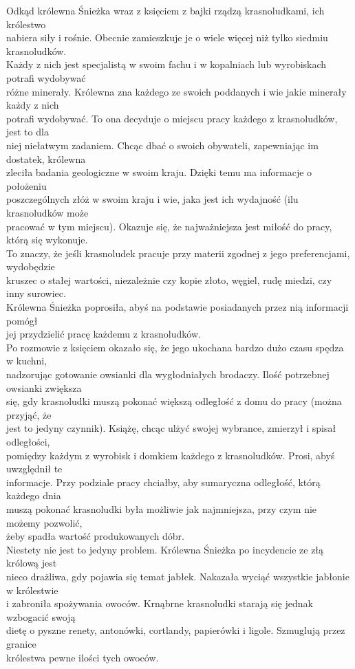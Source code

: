 \documentclass{article}
\begin{document}
Odkąd królewna Śnieżka wraz z księciem z bajki rządzą krasnoludkami, ich królestwo \\ nabiera siły i rośnie. Obecnie zamieszkuje je o wiele więcej niż tylko siedmiu krasnoludków. \\ Każdy z nich jest specjalistą w swoim fachu i w kopalniach lub wyrobiskach potrafi wydobywać \\ różne minerały. Królewna zna każdego ze swoich poddanych i wie jakie minerały każdy z nich \\ potrafi wydobywać. To ona decyduje o miejscu pracy każdego z krasnoludków, jest to dla \\ niej niełatwym zadaniem. Chcąc dbać o swoich obywateli, zapewniając im dostatek, królewna \\ zleciła badania geologiczne w swoim kraju. Dzięki temu ma informacje o położeniu \\ poszczególnych złóż w swoim kraju i wie, jaka jest ich wydajność (ilu krasnoludków może \\ pracować w tym miejscu). Okazuje się, że najważniejsza jest miłość do pracy, którą się wykonuje. \\ To znaczy, że jeśli krasnoludek pracuje przy materii zgodnej z jego preferencjami, wydobędzie \\ kruszec o stałej wartości, niezależnie czy kopie złoto, węgiel, rudę miedzi, czy inny surowiec. \\ Królewna Śnieżka poprosiła, abyś na podstawie posiadanych przez nią informacji pomógł \\ jej przydzielić pracę każdemu z krasnoludków. \\ Po rozmowie z księciem okazało się, że jego ukochana bardzo dużo czasu spędza w kuchni, \\ nadzorując gotowanie owsianki dla wygłodniałych brodaczy. Ilość potrzebnej owsianki zwiększa \\ się, gdy krasnoludki muszą pokonać większą odległość z domu do pracy (można przyjąć, że \\ jest to jedyny czynnik). Książę, chcąc ulżyć swojej wybrance, zmierzył i spisał odległości, \\ pomiędzy każdym z wyrobisk i domkiem każdego z krasnoludków. Prosi, abyś uwzględnił te \\informacje. Przy podziale pracy chciałby, aby sumaryczna odległość, którą każdego dnia \\ muszą pokonać krasnoludki była możliwie jak najmniejsza, przy czym nie możemy pozwolić, \\ żeby spadła wartość produkowanych dóbr. \\ Niestety nie jest to jedyny problem. Królewna Śnieżka po incydencie ze złą królową jest \\ nieco drażliwa, gdy pojawia się temat jabłek. Nakazała wyciąć wszystkie jabłonie w królestwie \\ i zabroniła spożywania owoców. Krnąbrne krasnoludki starają się jednak wzbogacić swoją \\ dietę o pyszne renety, antonówki, cortlandy, papierówki i ligole. Szmuglują przez granice \\ królestwa pewne ilości tych owoców. 
\end{document}
